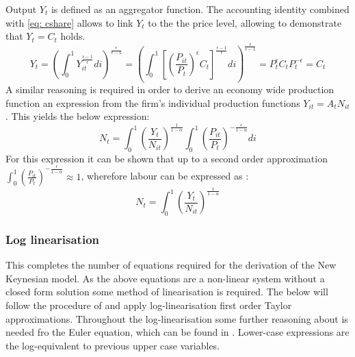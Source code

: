 \documentclass[12pt,a4paper,english]{article} %
\begin{document}
	Output $Y_t$ is defined as an aggregator function. The accounting identity combined with \eqref{eq: cshare} allows to link $Y_t$ to the the price level, allowing to demonstrate that $Y_t = C_t$ holds.
	\begin{equation}
			Y_t = 
			\left( 
				\int_{0}^{1} Y_{it}^{\frac{\epsilon - 1}{\epsilon}} di 
			\right)^{\frac{\epsilon}{\epsilon - 1}}
			=
			\left( 
			\int_{0}^{1} 
			\left[
			\left( \frac{P_{it}}{P_t} \right)^\epsilon C_t
			\right]^{\frac{\epsilon - 1}{\epsilon}} di 
			\right)^{\frac{\epsilon}{\epsilon - 1}}
			=
			P_t^{\epsilon} C_t P_t^{-\epsilon}
			=
			C_t
	\end{equation}
	A similar reasoning is required in order to derive an economy wide production function an expression from the firm's individual production functions $Y_{it} = A_t N_{it}$. This yields the below expression:
	\begin{equation}
		N_t = 	
		\int_{0}^{1} \left( \frac{Y_t}{N_{it}} \right)^{\frac{1}{1 - \alpha}}
		\int_{0}^{1} \left( \frac{P_{it}}{P_t} \right)^{-\frac{\epsilon}{1 - \alpha}} di
	\end{equation}
	For this expression it can be shown that up to a second order approximation $\int_{0}^{1} \left( \frac{P_{it}}{P_t} \right)^{-\frac{\epsilon}{1 - \alpha}} \approx 1$, wherefore labour can be expressed as \cite{gali_monetary_2008}:
	\begin{equation}\label{eq: Nt}
		N_t = \int_{0}^{1} \left( \frac{Y_t}{N_{it}} \right)^{\frac{1}{1 - \alpha}}
	\end{equation}
	
	\subsubsection{Log linearisation}
	This completes the number of equations required for the derivation of the New Keynesian model. As the above equations are a non-linear system without a closed form solution some method of linearisation is required. The below will follow the procedure of \cite{gali_monetary_2008} and apply log-linearisation first order Taylor approximations. Throughout the log-linearisation some further reasoning about is needed fro the Euler equation, which can be found in . Lower-case expressions are the log-equivalent to previous upper case variables. \\
	
\end{document}
